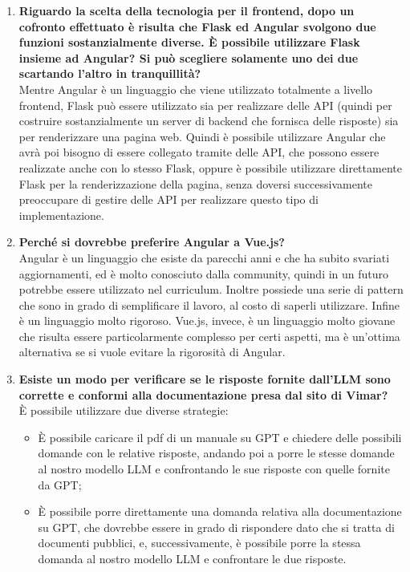 \begin{enumerate}
    \begin{enumerate}[label=\Alph*)]
        \item \textbf{Riguardo la scelta della tecnologia per il frontend, dopo un cofronto effettuato è risulta che Flask ed Angular svolgono due funzioni sostanzialmente diverse. \`E possibile utilizzare Flask insieme ad Angular? Si può scegliere solamente uno dei due scartando l'altro in tranquillità?}\\
        Mentre Angular è un linguaggio che viene utilizzato totalmente a livello frontend, Flask può essere utilizzato sia per realizzare delle API (quindi per costruire sostanzialmente un server di backend che fornisca delle risposte) sia per renderizzare una pagina web. Quindi è possibile utilizzare Angular che avrà poi bisogno di essere collegato tramite delle API, che possono essere realizzate anche con lo stesso Flask, oppure è possibile utilizzare direttamente Flask per la renderizzazione della pagina, senza doversi successivamente preoccupare di gestire delle API per realizzare questo tipo di implementazione.
        \item \textbf{Perché si dovrebbe preferire Angular a Vue.js?}\\
        Angular è un linguaggio che esiste da parecchi anni e che ha subito svariati aggiornamenti, ed è molto conosciuto dalla community, quindi in un futuro potrebbe essere utilizzato nel curriculum. Inoltre possiede una serie di pattern che sono in grado di semplificare il lavoro, al costo di saperli utilizzare. Infine è un linguaggio molto rigoroso. Vue.js, invece, è un linguaggio molto giovane che risulta essere particolarmente complesso per certi aspetti, ma è un'ottima alternativa se si vuole evitare la rigorosità di Angular.
        \item \textbf{Esiste un modo per verificare se le risposte fornite dall'LLM sono corrette e conformi alla documentazione presa dal sito di Vimar?}\\
        \`E possibile utilizzare due diverse strategie:
        \begin{itemize}
            \item \`E possibile caricare il pdf di un manuale su GPT e chiedere delle possibili domande con le relative risposte, andando poi a porre le stesse domande al nostro modello LLM e confrontando le sue risposte con quelle fornite da GPT;
            \item \`E possibile porre direttamente una domanda relativa alla documentazione su GPT, che dovrebbe essere in grado di rispondere dato che si tratta di documenti pubblici, e, successivamente, è possibile porre la stessa domanda al nostro modello LLM e confrontare le due risposte.

\end{itemize}
\end{enumerate}
\end{enumerate}
